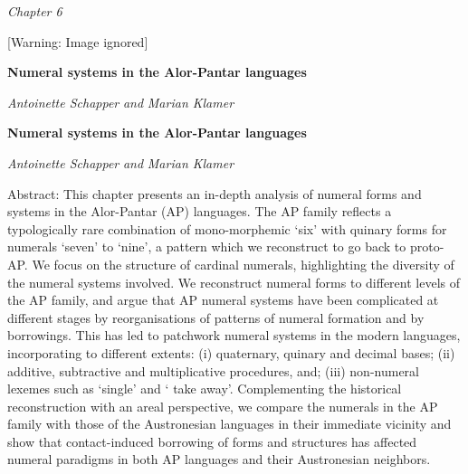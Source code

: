 \clearpage\setcounter{page}{1}\pagestyle{Standard}
{\centering\itshape
Chapter 6
\par}

\begin{center}
 [Warning: Image ignored] %

\end{center}
{\centering\bfseries
Numeral systems in the Alor-Pantar languages
\par}

{\centering
\textit{Antoinette Schapper }\textit{and}\textit{ Marian Klamer}
\par}


{\centering\bfseries
Numeral systems in the Alor-Pantar languages
\par}

{\centering
\textit{Antoinette Schapper }\textit{and}\textit{ Marian Klamer}
\par}

Abstract: This chapter presents an in-depth analysis of numeral forms and systems in the Alor-Pantar (AP) languages. The AP family reflects a typologically rare combination of mono-morphemic {\textquoteleft}six{\textquoteright} with quinary forms for numerals {\textquoteleft}seven{\textquoteright} to {\textquoteleft}nine{\textquoteright}, a pattern which we reconstruct to go back to proto-AP. We focus on the structure of cardinal numerals, highlighting the diversity of the numeral systems involved. We reconstruct numeral forms to different levels of the AP family, and argue that AP numeral systems have been complicated at different stages by reorganisations of patterns of numeral formation and by borrowings. This has led to patchwork numeral systems in the modern languages, incorporating to different extents: (i) quaternary, quinary and decimal bases; (ii) additive, subtractive and multiplicative procedures, and; (iii) non-numeral lexemes such as {\textquoteleft}single{\textquoteright} and {\textquoteleft}
take away{\textquoteright}. Complementing the historical reconstruction with an areal perspective, we compare the numerals in the AP family with those of the Austronesian languages in their immediate vicinity and show that contact-induced borrowing of forms and structures has affected numeral paradigms in both AP languages and their Austronesian neighbors.

